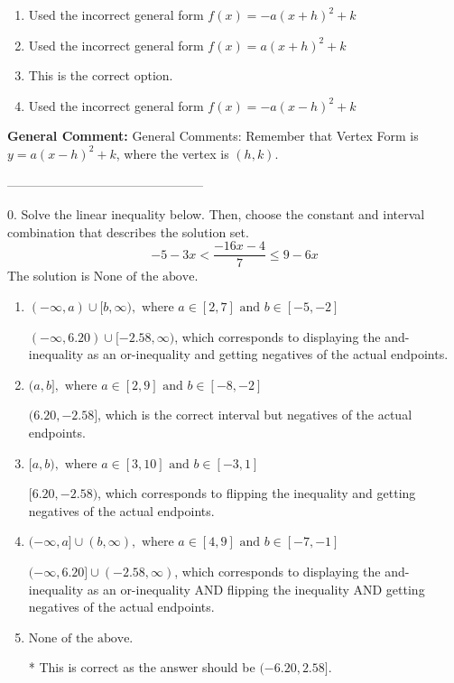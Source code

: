 \documentclass{extbook}[14pt]
\begin{document}
\begin{enumerate}[label=\Alph*.] 
\item Used the incorrect general form $f(x) = -a(x+h)^2 + k$  
\item Used the incorrect general form $f(x) = a(x+h)^2 + k$  
\item This is the correct option.  
\item Used the incorrect general form $f(x) = -a(x-h)^2 + k$  
\end{enumerate} 
 
\textbf{General Comment:} General Comments: Remember that Vertex Form is $y = a(x-h)^2+k$, where the vertex is $(h, k)$. 

-----------------------------------------------

0. Solve the linear inequality below. Then, choose the constant and interval combination that describes the solution set.
\[ -5 - 3 x < \frac{-16 x - 4}{7} \leq 9 - 6 x \] 
The solution is $ \text{None of the above.} $ 

\begin{enumerate}[label=\Alph*.] 
\item $ (-\infty, a) \cup [b, \infty), \text{ where } a \in [2, 7] \text{ and } b \in [-5, -2] $ 

 $(-\infty, 6.20) \cup [-2.58, \infty)$, which corresponds to displaying the and-inequality as an or-inequality and getting negatives of the actual endpoints. 
\item $ (a, b], \text{ where } a \in [2, 9] \text{ and } b \in [-8, -2] $ 

 $(6.20, -2.58]$, which is the correct interval but negatives of the actual endpoints. 
\item $ [a, b), \text{ where } a \in [3, 10] \text{ and } b \in [-3, 1] $ 

 $[6.20, -2.58)$, which corresponds to flipping the inequality and getting negatives of the actual endpoints. 
\item $ (-\infty, a] \cup (b, \infty), \text{ where } a \in [4, 9] \text{ and } b \in [-7, -1] $ 

 $(-\infty, 6.20] \cup (-2.58, \infty)$, which corresponds to displaying the and-inequality as an or-inequality AND flipping the inequality AND getting negatives of the actual endpoints. 
\item $ \text{None of the above.} $ 

 * This is correct as the answer should be $(-6.20, 2.58]$. 
\end{enumerate} 
 
\end{document}
